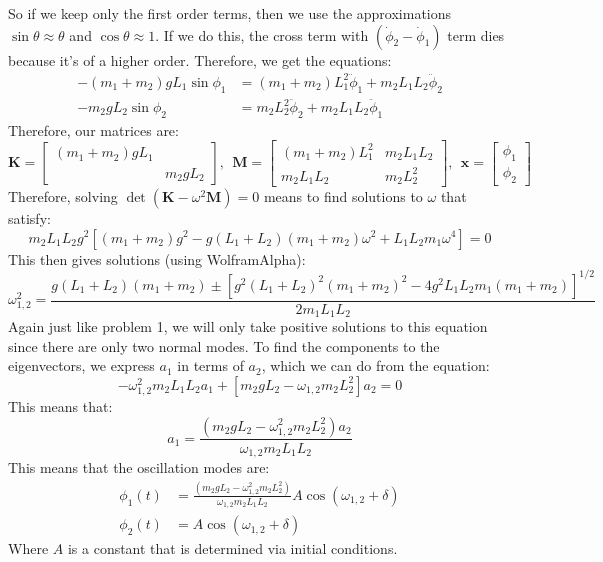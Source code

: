 \documentclass[10pt]{article}
\begin{document}
\begin{enumerate}[label=\alph*)]
		\begin{solution}
			So if we keep only the first order terms, then we use the approximations $\sin \theta \approx \theta$
			and $\cos \theta \approx 1$. If we do this, the cross term with $(\dot \phi_2 - \dot \phi_1)$ term
			dies because it's of a higher order. Therefore, we get the equations: 
			\begin{align*}
				-(m_1 + m_2)gL_1 \sin \phi_1 &= (m_1 + m_2) L_1^2 \ddot \phi_1 + m_2L_1L_2 \ddot \phi_2\\
				-m_2gL_2 \sin \phi_2 &= m_2L_2^2 \ddot \phi_2 + m_2L_1L_2\ddot \phi_1
			\end{align*}
			Therefore, our matrices are: 
			\[
				\mathbf K = \begin{bmatrix} (m_1 + m_2)gL_1 & \\ & m_2gL_2 \end{bmatrix}, \ \  
				\mathbf M = \begin{bmatrix} (m_1 + m_2)L_1^2 & m_2L_1L_2\\ m_2L_1L_2 & m_2L_2^2 \end{bmatrix},
				\ \ \mathbf x = \begin{bmatrix} \phi_1 \\ \phi_2 \end{bmatrix} 
			\]
			Therefore, solving $\det(\mathbf K - \omega^2 \mathbf M) = 0$ means to find solutions to $\omega$ 
			that satisfy: 
			\[
				m_2L_1L_2g^2\left[(m_1 + m_2)g^2 - g(L_1 + L_2)(m_1 + m_2)\omega^2 + L_1L_2m_1 \omega^4\right]=0
			\] 
			This then gives solutions (using WolframAlpha): 
			\[
				\omega_{1, 2}^2 = \frac{g(L_1 + L_2)(m_1 + m_2) \pm \left[g^2(L_1 + L_2)^2(m_1 +m_2)^2 - 4g^2L_1
				L_2m_1(m_1 + m_2)\right]^{1/2}}{2m_1L_1L_2}
			\] 
			Again just like problem 1, we will only take positive solutions to this equation since there are
			only two normal modes. To find the components to the eigenvectors, we express $a_1$ in terms of 
			$a_2$, which we can do from the equation: 
			\[
				-\omega_{1, 2}^2 m_2L_1L_2a_1 + \left[m_2gL_2 - \omega_{1, 2}m_2L_2^2\right]a_2 = 0
			\] 
			This means that: 
			\[
				a_1 = \frac{(m_2gL_2 - \omega_{1, 2}^2 m_2L_2^2)a_2}{\omega_{1, 2}m_2L_1L_2}
			\] 
			This means that the oscillation modes are:
			\begin{align*}
				\phi_1(t) &= \frac{(m_2gL_2 - \omega_{1, 2}^2 m_2L_2^2)}{\omega_{1, 2}m_2L_1L_2}A 
				\cos(\omega_{1, 2} + \delta)\\
				\phi_2(t) &= A \cos(\omega_{1, 2} + \delta)
			\end{align*}
			Where $A$ is a constant that is determined via initial conditions. 
		\end{solution}

	\end{enumerate} 
\end{document}
